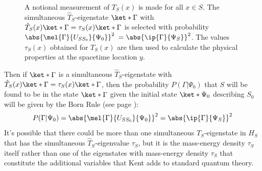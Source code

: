 \documentclass[12pt]{report}
\begin{document}
  \begin{figure}[ht!]
    \captionsetup{justification=justified}
    \centering
    
    
    
    \vspace*{2px}
    \caption[Depiction of a notional measurement of $T_S(x)$]{A notional measurement of $T_S(x)$ is made for all $x\in S$. The simultaneous  $\hat{T}_S$-eigenstate $\ket*{\Gamma}$ with $\hat{T}_S(x)\ket*{\Gamma}=\tau_S(x)\ket*{\Gamma}$ is selected with probability $\abs{\mel{\Gamma}{U_{SS_0}}{\Psi_0}}^2$ $=\abs{\ip{\Gamma}{\Psi_S}}^2$. The values $\tau_S(x)$ obtained for $T_S(x)$ are then used to calculate the physical properties at the spacetime location $y$.  }
    \label{S1}
    \end{figure} Then if $\ket*{\Gamma}$ is a simultaneous  $\hat{T}_S$-eigenstate with $\hat{T}_S(x)\ket*{\Gamma}=\tau_S(x)\ket*{\Gamma}$, then the probability $P(\Gamma|\Psi_0)$ %
  that $S$ will be found to be in the state $\ket*{\Gamma}$ given the initial state $\ket*{\Psi_0}$ describing $S_0$ will be given by the Born Rule (see page \pageref{bornrule}):    
  \begin{equation}\label{bornpsi}
    P(\Gamma|\Psi_0) = \abs{\mel{\Gamma}{U_{SS_0}}{\Psi_0}}^2=\abs{\ip{\Gamma}{\Psi_S}}^2
    \end{equation}
  It's  possible that there could be more than one simultaneous  $\hat{T}_S$-eigenstate  in  $H_S$ that has the simultaneous  $\hat{T}_S$-eigenvalue $\tau_S$, but it is the mass-energy density $\tau_S$ itself rather than one of the eigenstates with mass-energy density $\tau_S$ that constitute the additional variables that Kent adds to standard quantum theory. 
\end{document}
